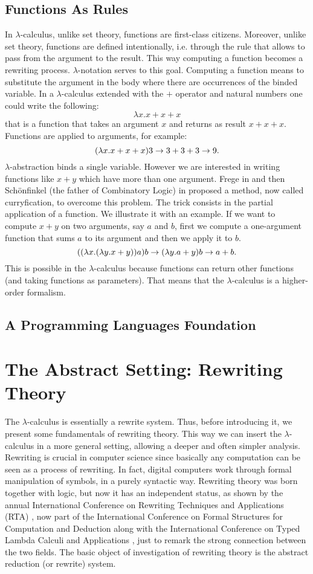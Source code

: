 \subsection{Functions As Rules}
In $\lambda$-calculus, unlike set theory, functions are first-class citizens. Moreover, unlike set theory, functions are defined intentionally, i.e. through the rule that allows to pass from the argument to the result. This way computing a function becomes a rewriting process. $\lambda$-notation serves to this goal. Computing a function means to substitute the argument in the body where there are occurrences of the binded variable. In a $\lambda$-calculus extended with the $+$ operator and natural numbers one could write the following:
$$
\lambda x. x+x+x
$$
that is a function that takes an argument $x$ and returns as result $x+x+x$. Functions are applied to arguments, for example:
$$
(\lambda x. x+x+x)3\rightarrow3+3+3\rightarrow 9.
$$
$\lambda$-abstraction binds a single variable. However we are interested in writing functions like $x+y$ which have more than one argument. Frege in \cite{} and then Schönfinkel (the father of Combinatory Logic) in \cite{} proposed a method, now called curryfication, to overcome this problem. The trick consists in the partial application of a function.  We illustrate it with an example. If we want to compute $x+y$ on two arguments, say $a$ and $b$, first we compute a one-argument function that sums $a$ to its argument and then we apply it to $b$.
$$
((\lambda x.(\lambda y.x+y))a)b\rightarrow(\lambda y.a+y)b\rightarrow a+b.
$$
This is possible in the $\lambda$-calculus because functions can return other functions (and taking functions as parameters). That means that the $\lambda$-calculus is a higher-order formalism.
\subsection{A Programming Languages Foundation}
\section{The Abstract Setting: Rewriting Theory}
The $\lambda$-calculus is essentially a rewrite system. Thus, before introducing it, we present some fundamentals of rewriting theory. This way we can insert the $\lambda$-calculus in a more general setting, allowing a deeper and often simpler analysis. Rewriting is crucial in computer science since basically any computation can be seen as a process of rewriting. In fact, digital computers work through formal manipulation of symbols, in a purely syntactic way. Rewriting theory was born together with logic, but now it has an independent status, as shown by the annual International Conference on Rewriting Techniques and Applications (RTA) \cite{noauthor_rta_nodate}, now part of the International Conference on Formal Structures for Computation and Deduction along with the  International Conference on Typed Lambda Calculi and Applications \cite{noauthor_notitle_nodate}, just to remark the strong connection between the two fields. The basic object of investigation of rewriting theory is the abstract reduction (or rewrite) system. 


